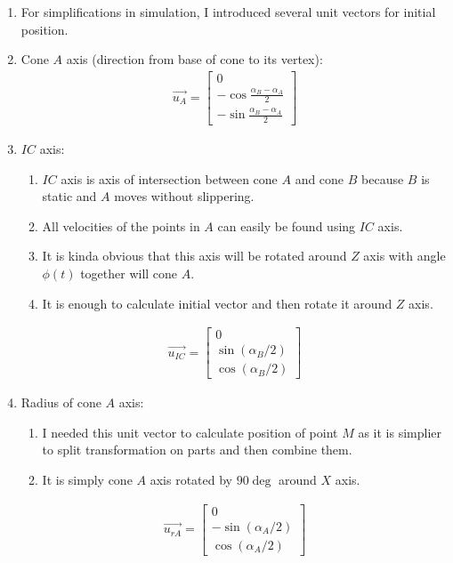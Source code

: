 \begin{enumerate}
    \item For simplifications in simulation, I introduced several unit vectors for initial position.
    \item Cone $A$ axis (direction from base of cone to its vertex):
          \begin{align}
              \vec{u_A} = \begin{bmatrix}
                  0                                     \\
                  -\cos{\frac{ \alpha_B - \alpha_A}{2}} \\
                  -\sin{\frac{\alpha_B - \alpha_A}{2}}
              \end{bmatrix}
          \end{align}
    \item $IC$ axis:
          \begin{enumerate}
              \item $IC$ axis is axis of intersection between cone $A$ and cone $B$ because $B$ is static and $A$ moves without slippering.
              \item All velocities of the points in $A$ can easily be found using $IC$ axis.
              \item It is kinda obvious that this axis will be rotated around $Z$ axis with angle $\phi(t)$ together will cone $A$.
              \item It is enough to calculate initial vector and then rotate it around $Z$ axis.
          \end{enumerate}
          \begin{align}
              \vec{u_{IC}} = \begin{bmatrix}
                  0                    \\
                  \sin({\alpha_B / 2}) \\
                  \cos({\alpha_B / 2})
              \end{bmatrix}
          \end{align}
    \item Radius of cone $A$ axis:
          \begin{enumerate}
              \item I needed this unit vector to calculate position of point $M$ as it is simplier to split transformation on parts and then combine them.
              \item It is simply cone $A$ axis rotated by $90\deg$ around $X$ axis.
          \end{enumerate}
          \begin{align}
              \vec{u_{rA}} = \begin{bmatrix}
                  0                     \\
                  -\sin({\alpha_A / 2}) \\
                  \cos({\alpha_A / 2})
              \end{bmatrix}
          \end{align}
\end{enumerate}

